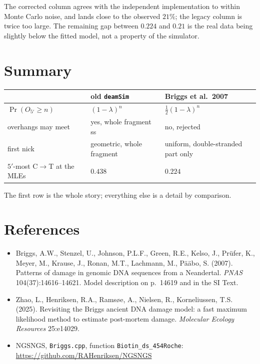 \documentclass[11pt,a4paper]{article}
\newcommand{\Ol}{O_{5'}}
\begin{document}
The corrected column agrees with the independent implementation to within Monte Carlo
noise, and lands close to the observed $21\%$; the legacy column is twice too large.
The remaining gap between $0.224$ and $0.21$ is the real data being slightly below the
fitted model, not a property of the simulator.

\section{Summary}

\begin{center}
\begin{tabular}{lll}
\toprule
 & old \texttt{deamSim} & Briggs et al.\ 2007 \\
\midrule
$\Pr(\Ol \geq n)$ & $(1-\lambda)^n$ & $\tfrac12 (1-\lambda)^n$ \\[2pt]
overhangs may meet & yes, whole fragment ss & no, rejected \\[2pt]
first nick & geometric, whole fragment & uniform, double-stranded part only \\[2pt]
$5'$-most C$\to$T at the MLEs & $0.438$ & $0.224$ \\
\bottomrule
\end{tabular}
\end{center}

\noindent
The first row is the whole story; everything else is a detail by comparison.

\section*{References}

\begin{itemize}
\item Briggs, A.W., Stenzel, U., Johnson, P.L.F., Green, R.E., Kelso, J., Pr\"ufer, K.,
      Meyer, M., Krause, J., Ronan, M.T., Lachmann, M., P\"a\"abo, S. (2007).
      Patterns of damage in genomic DNA sequences from a Neandertal.
      \emph{PNAS} 104(37):14616--14621. Model description on p.\ 14619 and in the SI Text.
\item Zhao, L., Henriksen, R.A., Rams\o{}e, A., Nielsen, R., Korneliussen, T.S. (2025).
      Revisiting the Briggs ancient DNA damage model: a fast maximum likelihood method
      to estimate post-mortem damage. \emph{Molecular Ecology Resources} 25:e14029.
\item NGSNGS, \texttt{Briggs.cpp}, function \texttt{Biotin\_ds\_454Roche}:
      \url{https://github.com/RAHenriksen/NGSNGS}
\end{itemize}
\end{document}
